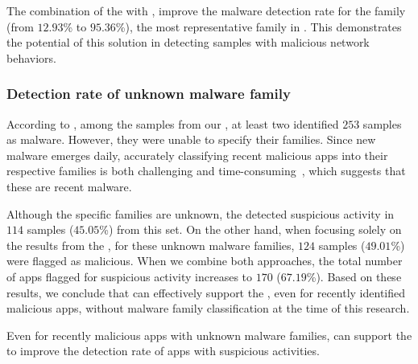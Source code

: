 \begin{finding}

The combination of the \mas with \net, improve the malware detection rate for the \gps family (from $12.93$\% to $95.36$\%), the most representative family in \cds. This demonstrates the potential of this solution in detecting samples with malicious network behaviors.

\end{finding}


\subsubsection{Detection rate of unknown malware family}\label{sec:unknowfamily}

According to \vt, among the samples from our \cds, at least two \ses identified $253$ samples as malware. However, they were unable to specify their families. Since new malware emerges daily, accurately classifying recent malicious apps into their respective families is both challenging and time-consuming~\cite{DBLP:journals/compsec/WangTW21,DBLP:journals/compsec/ContiKP22}, which suggests that these are recent malware.

Although the specific families are unknown, the \mas detected suspicious activity in $114$ samples ($45.05$\%) from this set. On the other hand, when focusing solely on the results from the \net, for these unknown malware families, $124$ samples ($49.01$\%) were flagged as malicious. When we combine both approaches, the total number of apps flagged for suspicious activity increases to $170$ ($67.19$\%). Based on these results, we conclude that \net can effectively support the \mas, even for recently identified malicious apps, without malware family classification at the time of this research.

\begin{finding}

Even for recently malicious apps with unknown malware families, \net can support the \mas to improve the detection rate of apps with suspicious activities.

\end{finding}